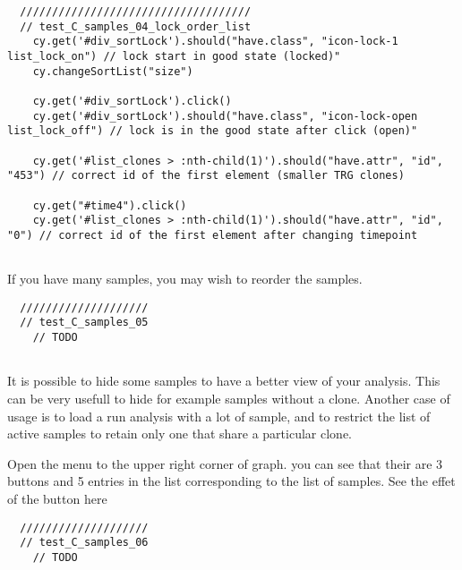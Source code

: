 \begin{verbatim}
  ////////////////////////////////////
  // test_C_samples_04_lock_order_list
    cy.get('#div_sortLock').should("have.class", "icon-lock-1 list_lock_on") // lock start in good state (locked)"
    cy.changeSortList("size")

    cy.get('#div_sortLock').click()
    cy.get('#div_sortLock').should("have.class", "icon-lock-open list_lock_off") // lock is in the good state after click (open)"

    cy.get('#list_clones > :nth-child(1)').should("have.attr", "id", "453") // correct id of the first element (smaller TRG clones)

    cy.get("#time4").click()
    cy.get('#list_clones > :nth-child(1)').should("have.attr", "id", "0") // correct id of the first element after changing timepoint


\end{verbatim}

\bigskip

If you have many samples, you may wish to reorder the samples.

\begin{verbatim}
  ////////////////////
  // test_C_samples_05
    // TODO


\end{verbatim}

It is possible to hide some samples to have a better view of your analysis. This can be very usefull to hide for example samples without a clone.
Another case of usage is to load a run analysis with a lot of sample, and to restrict the list of active samples to retain only one that share a particular clone.

Open the menu to the upper right corner of graph. you can see that their are 3 buttons and 5 entries in the list corresponding to the list of samples.
See the effet of the button here
\begin{verbatim}
  ////////////////////
  // test_C_samples_06
    // TODO


\end{verbatim}

